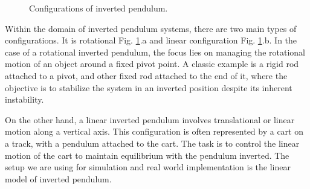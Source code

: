 \begin{figure}[!tbh]
	\hfill
	\hfill
	\hfill
	\caption{Configurations of inverted pendulum.}\label{RotAndLin}
\end{figure}

Within the domain of inverted pendulum systems, there are two main types of configurations. It is rotational Fig. \ref{RotAndLin}.a and linear configuration Fig. \ref{RotAndLin}.b. In the case of a rotational inverted pendulum, the focus lies on managing the rotational motion of an object around a fixed pivot point. A classic example is a rigid rod attached to a pivot, and other fixed rod attached to the end of it, where the objective is to stabilize the system in an inverted position despite its inherent instability.

On the other hand, a linear inverted pendulum involves translational or linear motion along a vertical axis. This configuration is often represented by a cart on a track, with a pendulum attached to the cart. The task is to control the linear motion of the cart to maintain equilibrium with the pendulum inverted. The setup we are using for simulation and real world implementation is the linear model of inverted pendulum. 


